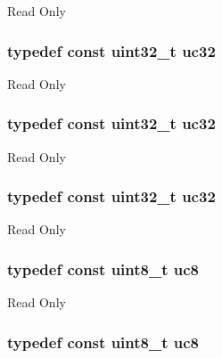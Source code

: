 Read Only \hypertarget{group___exported__types_ga5b628e6a05856ff67e535fa391a57683}{
\subsubsection[{uc32}]{\setlength{\rightskip}{0pt plus 5cm}typedef const uint32\-\_\-t {\bf uc32}}}\label{group___exported__types_ga5b628e6a05856ff67e535fa391a57683}
Read Only \hypertarget{group___exported__types_ga5b628e6a05856ff67e535fa391a57683}{
\subsubsection[{uc32}]{\setlength{\rightskip}{0pt plus 5cm}typedef const uint32\-\_\-t {\bf uc32}}}\label{group___exported__types_ga5b628e6a05856ff67e535fa391a57683}
Read Only \hypertarget{group___exported__types_ga5b628e6a05856ff67e535fa391a57683}{
\subsubsection[{uc32}]{\setlength{\rightskip}{0pt plus 5cm}typedef const uint32\-\_\-t {\bf uc32}}}\label{group___exported__types_ga5b628e6a05856ff67e535fa391a57683}
Read Only \hypertarget{group___exported__types_gac74022c74a461f810e0d4fdc9bfea480}{
\subsubsection[{uc8}]{\setlength{\rightskip}{0pt plus 5cm}typedef const uint8\-\_\-t {\bf uc8}}}\label{group___exported__types_gac74022c74a461f810e0d4fdc9bfea480}
Read Only \hypertarget{group___exported__types_gac74022c74a461f810e0d4fdc9bfea480}{
\subsubsection[{uc8}]{\setlength{\rightskip}{0pt plus 5cm}typedef const uint8\-\_\-t {\bf uc8}}}\label{group___exported__types_gac74022c74a461f810e0d4fdc9bfea480}
